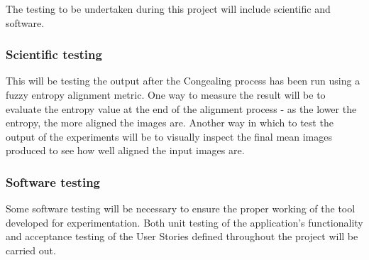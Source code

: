 The testing to be undertaken during this project will include scientific and software.

\subsubsection{Scientific testing}

This will be testing the output after the \Gls{Congealing} process has been run using a fuzzy entropy alignment metric. One way to measure the result will be to evaluate the entropy value at the end of the alignment process - as the lower the entropy, the more aligned the images are. Another way in which to test the output of the experiments will be to visually inspect the final mean images produced to see how well aligned the input images are.

\subsubsection{Software testing}

Some software testing will be necessary to ensure the proper working of the tool developed for experimentation. Both unit testing of the application's functionality and acceptance testing of the User Stories defined throughout the project will be carried out.
